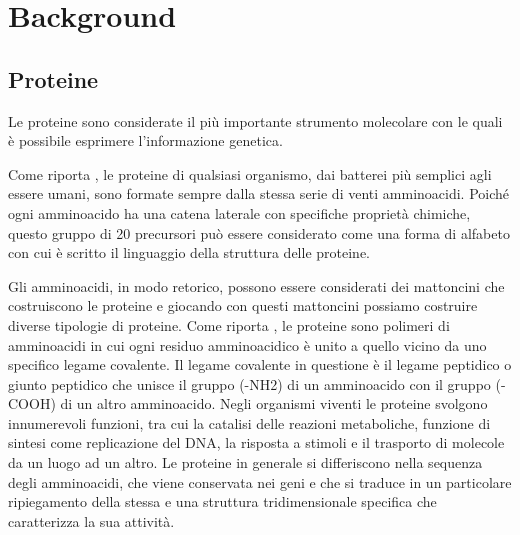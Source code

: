 \chapter{Background}\label{chapter:background}

\section{Proteine}\label{sec:proteine}
Le proteine sono considerate il più importante strumento molecolare con le quali è possibile esprimere l'informazione genetica. 

Come riporta \cite{Principi}, le proteine di qualsiasi organismo, dai batterei più semplici agli essere umani, sono formate sempre dalla stessa serie di venti amminoacidi. Poiché ogni amminoacido ha una catena laterale con specifiche proprietà chimiche, questo gruppo di 20 precursori può essere considerato come una forma di alfabeto con cui è scritto il linguaggio della struttura delle proteine. 

Gli amminoacidi, in modo retorico, possono essere considerati dei mattoncini che costruiscono le proteine e giocando con questi mattoncini possiamo costruire diverse tipologie di proteine. 
Come riporta \cite{Principi}, le proteine sono polimeri di amminoacidi in cui ogni residuo amminoacidico  è unito a quello vicino da uno specifico legame covalente. Il legame covalente in questione è il legame peptidico o giunto peptidico che unisce il gruppo (-NH2) di un amminoacido con il gruppo (-COOH) di un altro amminoacido. Negli organismi viventi le proteine svolgono innumerevoli funzioni, tra cui la catalisi delle reazioni metaboliche, funzione di sintesi come replicazione del DNA, la risposta a stimoli e il trasporto di molecole da un luogo ad un altro. Le proteine in generale si differiscono nella sequenza degli amminoacidi, che viene conservata nei geni e che si traduce in un particolare ripiegamento della stessa e una struttura tridimensionale specifica che caratterizza la sua attività.

